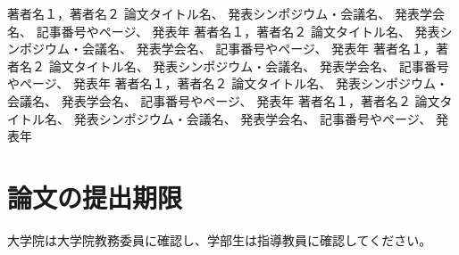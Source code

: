 \documentclass[a4paper]{jsarticle}
\begin{document}
\begin{thebibliography}{999}
  著者名１，著者名２
  論文タイトル名、
  発表シンポジウム・会議名、
  発表学会名、
  記事番号やページ、
  発表年
  著者名１，著者名２
  論文タイトル名、
  発表シンポジウム・会議名、
  発表学会名、
  記事番号やページ、
  発表年
  著者名１，著者名２
  論文タイトル名、
  発表シンポジウム・会議名、
  発表学会名、
  記事番号やページ、
  発表年
  著者名１，著者名２
  論文タイトル名、
  発表シンポジウム・会議名、
  発表学会名、
  記事番号やページ、
  発表年
  著者名１，著者名２
  論文タイトル名、
  発表シンポジウム・会議名、
  発表学会名、
  記事番号やページ、
  発表年

\end{thebibliography}

\section*{論文の提出期限}
大学院は大学院教務委員に確認し、学部生は指導教員に確認してください。
\end{document}
